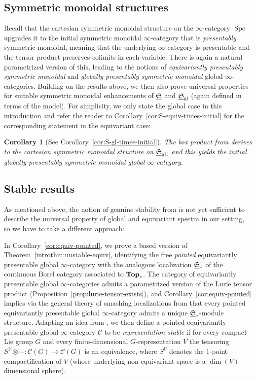 \documentclass[reqno]{memo-l}
\theoremstyle{mythm}
\newtheorem{introcor}[introthm]{Corollary}
\theoremstyle{definition}
\numberwithin{equation}{section}
\newcommand{\Cc}{{\mathcal{C}}}
\newcommand{\gl}{\textup{gl}}
\DeclareMathOperator{\Spc}{Spc}
\newcommand{\cat}[1]{\textbf{\textup{#1}}}
\newcommand{\ulhelper}[2]{\underline{\setbox0=\hbox{$#1#2$}\dp0=0.4pt \box0\relax}}
\newcommand{\ul}[1]{{\mathpalette\ulhelper{#1}}\hbox{\rule[-2pt]{0pt}{0pt}}}
\newcommand{\myS}{{{\mathfrak S\kern-.4pt}}}
\begin{document}
\subsection*{Symmetric monoidal structures} Recall that the cartesian symmetric monoidal structure on the $\infty$-category $\Spc$ upgrades it to the initial symmetric monoidal $\infty$-category that is \emph{presentably} symmetric monoidal, meaning that the underlying $\infty$-category is presentable and the tensor product preserves colimits in each variable. There is again a natural parametrized version of this, leading to the notions of \emph{equivariantly presentably symmetric monoidal} and \emph{globally presentably symmetric monoidal} global $\infty$-categories. Building on the results above, we then also prove universal properties for suitable symmetric monoidal enhancements of $\ul\myS$ and $\ul\myS_\gl$ (again defined in terms of the model). For simplicity, we only state the global case in this introduction and refer the reader to Corollary~\ref{cor:S-equiv-times-initial} for the corresponding statement in the equivariant case:

\begin{introcor}[See Corollary~\ref{cor:S-gl-times-initial}]
    The box product from \cites{schwede2018global,barrero2021} derives to the cartesian  symmetric monoidal structure on $\ul\myS_\gl$, and this yields the initial globally presentably symmetric monoidal global $\infty$-category.
\end{introcor}

\subsection*{Stable results} As mentioned above, the notion of genuine stability from \cite{CLL_Global} is not yet sufficient to describe the universal property of global and equivariant spectra in our setting, so we have to take a different approach: 

In Corollary~\ref{cor:equiv-pointed}, we prove a based version of Theorem~\ref{introthm:unstable-equiv}, identifying the free \emph{pointed} equivariantly presentable global $\infty$-category with the analogous localization $\ul\myS_*$ of the continuous Borel category associated to $\cat{Top}_*$. 
The category of equivariantly presentable global $\infty$-categories admits a parametrized version of the Lurie tensor product (Proposition~\ref{prop:lurie-tensor-exists}), and Corollary~\ref{cor:equiv-pointed} implies via the general theory of smashing localizations from \cite{HA} that every pointed equivariantly presentable global $\infty$-category admits a unique $\ul\myS_*$-module structure. 
Adapting an idea from \cite{Linskens2023globalization}, we then define a pointed equivariantly presentable global $\infty$-category $\Cc$ to be \emph{representation stable} if for every compact Lie group $G$ and every finite-dimensional $G$-representation $V$ the tensoring $S^V\otimes{-}\colon\Cc(G)\to\Cc(G)$ is an equivalence, where $S^V$ denotes the 1-point compactification of $V$ (whose underlying non-equivariant space is a $\dim(V)$-dimensional sphere). 
\end{document}
